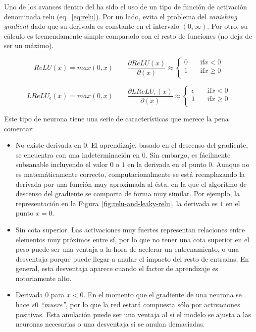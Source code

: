 Uno de los avances dentro del  ha sido el uso de un tipo de función de activación denominada \acrfull{relu} (eq.~\ref{eq:relu}). Por un lado, evita el problema del \textit{vanishing gradient} dado que su derivada es constante en el intervalo $(0, \infty)$. Por otro, su cálculo es tremendamente simple comparado con el resto de funciones (no deja de ser un máximo).

\begin{equation}
	ReLU(x) = max(0, x) \qquad
	\frac{\partial ReLU(x)}{\partial(x)} \approx
	\begin{cases}
	0 &\quad\text{if} x < 0 \\
	1 &\quad\text{if} x \geq 0 \\
	\end{cases}
	\label{eq:relu}
\end{equation}

\begin{equation}
	LReLU_\epsilon(x) = max(0, x) \qquad
	\frac{\partial LReLU_\epsilon(x)}{\partial(x)} \approx
	\begin{cases}
	\epsilon &\quad\text{if} x < 0 \\
	1 &\quad\text{if} x \geq 0 \\
	\end{cases}
	\label{eq:leaky-relu}
\end{equation}

Este tipo de neurona tiene una serie de características que merece la pena comentar:

\begin{itemize}
	\item No existe derivada en $0$. El aprendizaje, basado en el descenso del gradiente, se encuentra con una indeterminación en $0$. Sin embargo, es fácilmente subsanable incluyendo el valor $0$ o $1$ en la derivada en el punto $0$. Aunque no es matemáticamente correcto, computacionalmente se está reemplazando la derivada por una función muy aproximada al ésta, en la que el algoritmo de descenso del gradiente se comporta de forma muy similar. Por ejemplo, la representación en la Figura~\ref{fig:relu-and-leaky-relu}, la derivada es $1$ en el punto $x = 0$.
	\item Sin cota superior. Las activaciones muy fuertes representan relaciones entre elementos muy próximos entre sí, por lo que no tener una cota superior en el peso puede ser una ventaja a la hora de acelerar un entrenamiento, o una desventaja porque puede llegar a anular el impacto del resto de entradas. En general, esta desventaja aparece cuando el factor de aprendizaje es notoriamente alto.
	\item Derivada $0$ para $x < 0$. En el momento que el gradiente de una neurona se hace $s0$ \textit{\enquote{muere}}, por lo que la red estará compuesta sólo por activaciones positivas. Esta anulación puede ser una ventaja al si el modelo se ajusta a las neuronas necesarias o una desventaja si se anulan demasiadas.
\end{itemize}


